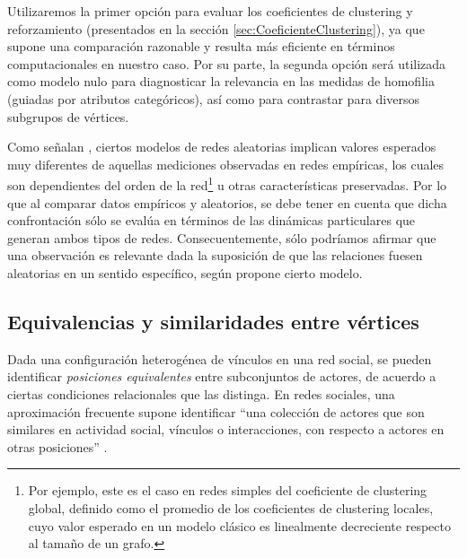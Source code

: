 \documentclass[letterpaper, 11pt]{book}
\theoremstyle{definition}
\theoremstyle{remark}
\begin{document}
Utilizaremos la primer opción para evaluar los coeficientes de clustering y reforzamiento (presentados en la sección \ref{sec:CoeficienteClustering}), ya que supone una comparación razonable y resulta más eficiente en términos computacionales en nuestro caso. 
Por su parte, la segunda opción será utilizada como modelo nulo para diagnosticar la relevancia en las medidas de homofilia (guiadas por atributos categóricos), así como para contrastar  para diversos subgrupos de vértices. 

Como señalan \citet{2002_Barabasi_MechanicsOfComplexNetworks}, ciertos modelos de redes aleatorias implican valores esperados muy diferentes de aquellas mediciones observadas en redes empíricas, los cuales son dependientes del orden de la red\footnote{
    Por ejemplo, este es el caso en redes simples del coeficiente de clustering global, definido como el promedio de los coeficientes de clustering locales, cuyo valor esperado en un modelo clásico es linealmente decreciente respecto al tamaño de un grafo. 
} u otras características preservadas. 
Por lo que al comparar datos empíricos y aleatorios, se debe tener en cuenta que dicha confrontación sólo se evalúa en términos de las dinámicas particulares que generan ambos tipos de redes. 
Consecuentemente, sólo podríamos afirmar que una observación es relevante dada la suposición de que las relaciones fuesen aleatorias en un sentido específico, según propone cierto modelo. 




\subsection{Equivalencias y similaridades entre vértices}
\label{sec:EquivalenciaYSimilaridad}

Dada una configuración heterogénea de vínculos en una red social, se pueden identificar \emph{posiciones equivalentes} entre subconjuntos de actores, de acuerdo a ciertas condiciones relacionales que las distinga. 
En redes sociales, una aproximación frecuente supone identificar ``una colección de actores que son similares en actividad social, vínculos o interacciones, con respecto a actores en otras posiciones'' \citep[348]{1994_Wasserman_SNA}. 
\end{document}
